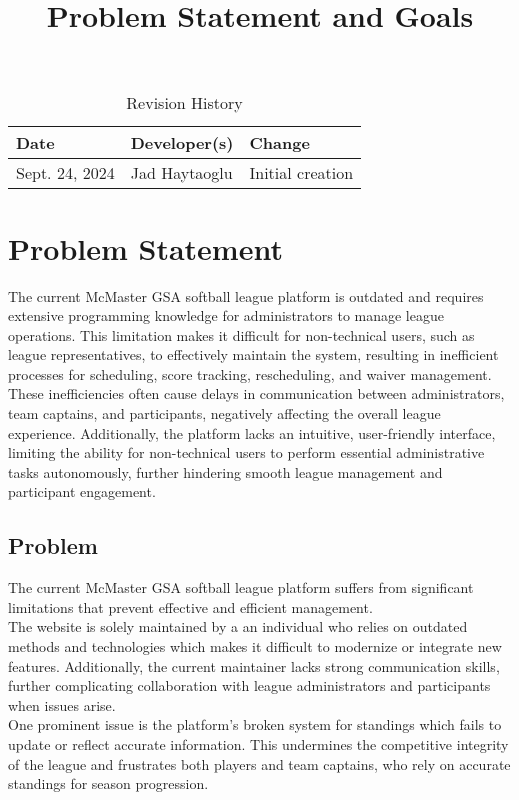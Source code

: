\documentclass{article}
\title{Problem Statement and Goals\\\progname}
\author{\authname}
\date{}
\begin{document}
\maketitle

\begin{table}[hp]
\caption{Revision History} \label{TblRevisionHistory}
\begin{tabularx}{\textwidth}{llX}
\toprule
\textbf{Date} & \textbf{Developer(s)} & \textbf{Change}\\
\midrule
Sept. 24, 2024 & Jad Haytaoglu & Initial creation\\
\bottomrule
\end{tabularx}
\end{table}

\section{Problem Statement}

The current McMaster GSA softball league platform is outdated and requires extensive programming knowledge for administrators to manage league operations. This limitation makes it difficult for non-technical users, such as league representatives, to effectively maintain the system, resulting in inefficient processes for scheduling, score tracking, rescheduling, and waiver management. These inefficiencies often cause delays in communication between administrators, team captains, and participants, negatively affecting the overall league experience. Additionally, the platform lacks an intuitive, user-friendly interface, limiting the ability for non-technical users to perform essential administrative tasks autonomously, further hindering smooth league management and participant engagement.

\pagebreak

\subsection{Problem}

The current McMaster GSA softball league platform suffers from significant limitations that prevent effective and efficient management.\\
The website is solely maintained by a an individual who relies on outdated methods and technologies which makes it difficult to modernize or integrate new features. Additionally, the current maintainer lacks strong communication skills, further complicating collaboration with league administrators and participants when issues arise.
\\
One prominent issue is the platform’s broken system for standings which fails to update or reflect accurate information. This undermines the competitive integrity of the league and frustrates both players and team captains, who rely on accurate standings for season progression.
\end{document}
